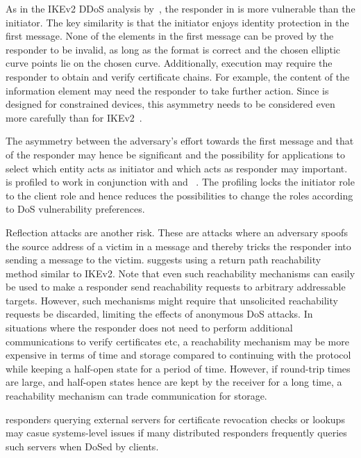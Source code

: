 \documentclass[runningheads]{llncs}
\begin{document}
As in the IKEv2 DDoS analysis by~\cite{rfc8019}, the responder in \mEdhoc{}
is more vulnerable than the initiator.
%
The key similarity is that the initiator enjoys identity protection in the
first message.
%
None of the elements in the first \mEdhoc{} message can be proved by the
responder to be invalid, as long as the format is correct and the chosen
elliptic curve points lie on the chosen curve.
%
Additionally, execution may require the responder to obtain and verify
certificate chains.
%
For example, the content of the \mADone{} information element may need 
the
responder to take further action.
%
Since \mEdhoc{} is designed for constrained devices, this asymmetry needs to 
be
considered even more carefully than for IKEv2~\cite{rfc8019}.
%

The asymmetry between the adversary's effort towards the first message and 
that
of the responder may hence be significant and the possibility for applications
to select which entity acts as initiator and which acts as responder may
important.
%
\mEdhoc{} is profiled to work in conjunction with \mCoap{} and
\mOscore{}~\cite{ietf-core-oscore-edhoc-03}.
%
The profiling locks the \mEdhoc{} initiator role to the \mCoap{} client role 
and
hence reduces the possibilities to change the \mEdhoc{} roles according to 
DoS
vulnerability preferences.
%

Reflection attacks are another risk.
%
These are attacks where an adversary spoofs the source address of a victim in a
message and thereby tricks the responder into sending a message to the 
victim.
%
\mEdhoc{} suggests using a return path reachability method similar to IKEv2.
%
Note that even such reachability mechanisms can easily be used to make a
responder send reachability requests to arbitrary addressable targets.
%
However, such mechanisms might require that unsolicited reachability 
requests be
discarded, limiting the effects of anonymous DoS attacks.
%
In situations where the responder does not need to perform additional
communications to verify certificates etc, a reachability mechanism may be 
more
expensive in terms of time and storage compared to continuing with the 
protocol
while keeping a half-open state for a period of time.
%
However, if round-trip times are large, and half-open states hence are kept by
the receiver for a long time, a reachability mechanism can trade 
communication
for storage.
%

\mEdhoc{} responders querying external servers for certificate revocation 
checks
or lookups may casue systems-level issues if many distributed \mEdhoc{}
responders frequently queries such servers when DoSed by clients.
%
\end{document}

